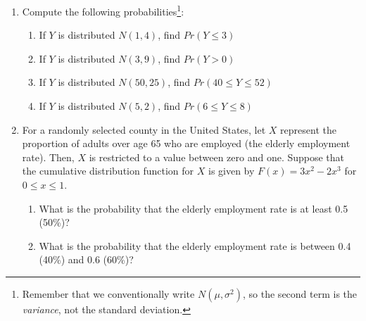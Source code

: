 \documentclass[
]{article}
\begin{document}
\begin{enumerate}
  \begin{enumerate}
  \def\labelenumii{\alph{enumii}.}
  \item
    Compute \(E[Y]\).
  \item
    The unemployment rate is the fraction of the labor force that is
    unemployed. Show that the unemployment rate is given by
    \(1 - E[Y]\).
  \item
    Calculate \(E[Y|X=1]\) and \(E[Y|X=0]\).
  \item
    Calculate the unemployment rate for college graduates and for
    non-college graduates
  \item
    A randomly selected member of this population reports being
    unemployed. What is the probability that this worker is a college
    graduate? A non-college graduate?
  \end{enumerate}

  \hspace{0pt} f.~Are educational achievement and employment status
  independent? Explain.
\item
  Compute the following probabilities\footnote{Remember that we
    conventionally write \(N(\mu,\sigma^2)\), so the second term is the
    \emph{variance}, not the standard deviation.}:

  \begin{enumerate}
  \def\labelenumii{\alph{enumii}.}
  \item
    If \(Y\) is distributed \(N(1,4)\), find \(Pr(Y \leq 3)\)
  \item
    If \(Y\) is distributed \(N(3,9)\), find \(Pr(Y >0 )\)
  \item
    If \(Y\) is distributed \(N(50,25)\), find \(Pr(40 \leq Y \leq 52)\)
  \item
    If \(Y\) is distributed \(N(5,2)\), find \(Pr(6 \leq Y \leq 8)\)
  \end{enumerate}
\item
  For a randomly selected county in the United States, let \(X\)
  represent the proportion of adults over age 65 who are employed (the
  elderly employment rate). Then, \(X\) is restricted to a value between
  zero and one. Suppose that the cumulative distribution function for
  \(X\) is given by \(F(x) = 3x^2 - 2x^3\) for \(0 \leq x \leq 1\).

  \begin{enumerate}
  \def\labelenumii{\alph{enumii}.}
  \item
    What is the probability that the elderly employment rate is at least
    0.5 (50\%)?
  \item
    What is the probability that the elderly employment rate is between
    0.4 (40\%) and 0.6 (60\%)?
  \end{enumerate}
\end{enumerate}
\end{document}
